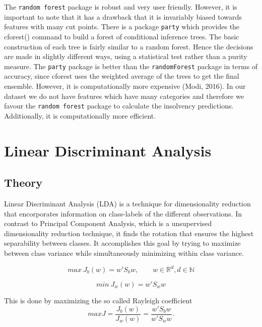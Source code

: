 \documentclass{article}
\begin{document}
The \texttt{random forest} package is robust and very user friendly. However, it is important to note that it has a drawback that it is invariably biased towards features with many cut points. There is a package \texttt{party} which provides the cforest() command to build a forest of conditional inference trees. The basic construction of each tree is fairly similar to a random forest. Hence the decisions are made in slightly different ways, using a statistical test rather than a purity measure. The \texttt{party} package is better than the \texttt{randomForest} package in terms of accuracy, since cforest uses the weighted average of the trees to get the final ensemble. However, it is computationally more expensive (Modi, 2016). In our dataset we do not have features which have many categories and therefore we favour the \texttt{random forest} package to 
calculate the insolvency predictions. Additionally, it is computationally more efficient.

\section{Linear Discriminant Analysis}
\subsection{Theory}

Linear Discriminant Analysis (LDA) is a technique for dimensionality reduction that encorporates information on class-labels of the different observations. In contrast to  Principal Component Analysis, which is a unsupervised dimensionality reduction technique, it finds the rotation that ensures the highest separability between classes. It accomplishes this goal by trying to maximize between class variance while simultaneously minimizing within class variance.

\begin{equation}
max\ J_{b}(w) = w \prime S_{b} w, \qquad w \in \mathbb{R}^d, d \in \mathbb{N}
\end{equation}

\begin{equation}
min\ J_{w}(w) = w \prime S_{w} w
\end{equation}

This is done by maximizing the so called Rayleigh coefficient
\begin{equation}
\label{LDA}
max J = \frac{J_b(w)}{J_w(w)} = \frac{w \prime S_{b} w}{w \prime S_{w} w}.
\end{equation}
\end{document}
